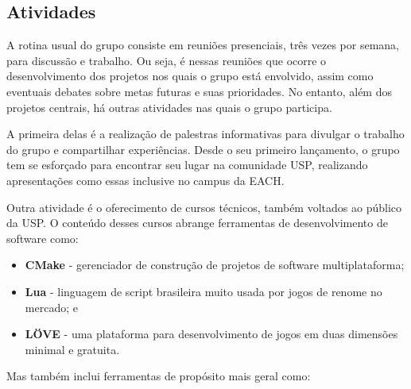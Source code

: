 \documentclass[12pt,onecolumn,a4paper]{article}
\begin{document}
    \subsection{Atividades}
    \label{sec:atividades}
        A rotina usual do grupo consiste em reuniões presenciais, três vezes por semana, para
        discussão e trabalho. Ou seja, é nessas reuniões que ocorre o desenvolvimento dos projetos
        nos quais o grupo está envolvido, assim como eventuais debates sobre metas futuras e suas
        prioridades. No entanto, além dos projetos centrais, há outras atividades nas quais o grupo
        participa.
        
        A primeira delas é a realização de palestras informativas para divulgar o trabalho do grupo
        e compartilhar experiências. Desde o seu primeiro lançamento, o grupo tem se esforçado para
        encontrar seu lugar na comunidade USP, realizando apresentações como essas inclusive no
        campus da EACH.
        
        Outra atividade é o oferecimento de cursos técnicos, também voltados ao público da USP. O
        conteúdo desses cursos abrange ferramentas de desenvolvimento de software como:

        \begin{itemize}
        
            \item{\bf CMake \footnotemark} - gerenciador de construção de projetos de software
                                             multiplataforma;
            
            \item {\bf Lua \footnotemark} - linguagem de script brasileira muito usada por jogos de
                                            renome no mercado; e

            \item {\bf LÖVE \footnotemark} - uma plataforma para desenvolvimento de jogos em duas
                                             dimensões minimal e gratuita.
            
        \end{itemize}
        
        Mas também inclui ferramentas de propósito mais geral como:
        
\end{document}
